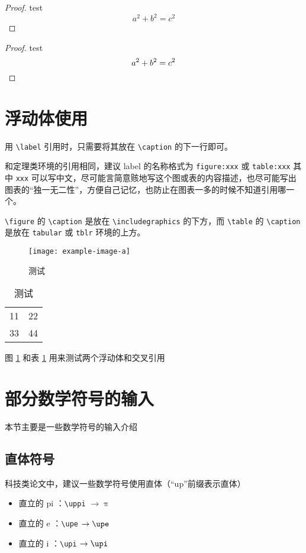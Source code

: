 \begin{proof}
  test
  \[
    a^2 + b^2 = c^2
  \]
\end{proof}

\begin{proof}
  test
  \[
    a^2 + b^2 = c^2  \qedhere
  \]
\end{proof}

\section{浮动体使用}

用 \verb|\label| 引用时，只需要将其放在 \verb|\caption| 的下一行即可。

和定理类环境的引用相同，建议 label 的名称格式为 \verb|figure:xxx| 或 \verb|table:xxx| 其中 \verb|xxx| 可以写中文，尽可能言简意赅地写这个图或表的内容描述，也尽可能写出图表的“独一无二性”，方便自己记忆，也防止在图表一多的时候不知道引用哪一个。

\verb|\figure| 的 \verb|\caption| 是放在 \verb|\includegraphics| 的下方，而 \verb|\table| 的 \verb|\caption| 是放在 \verb|tabular| 或 \verb|tblr| 环境的上方。

\begin{figure}[htbp]
  \centering
  \texttt{[image: example-image-a]}
  \caption{测试}
  \label{figure:test}
\end{figure}

\begin{table}[htbp]
  \centering
  \caption{测试}
  \label{table:test}
  \begin{tabular}{|c|c|}
    11 & 22 \\
    33 & 44 
  \end{tabular}
\end{table}

图 \ref{figure:test} 和表 \ref{table:test} 用来测试两个浮动体和交叉引用



\section{部分数学符号的输入}

本节主要是一些数学符号的输入介绍


\subsection{直体符号}

科技类论文中，建议一些数学符号使用直体（“up”前缀表示直体）
  \begin{itemize}
    \item 直立的 pi ：\verb|\uppi| $\to \uppi$
    \item 直立的 e ：\verb|\upe| $\to \upe$
    \item 直立的 i ：\verb|\upi| $\to \upi$
  \end{itemize}


